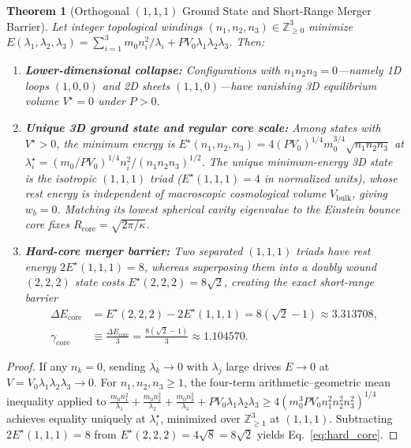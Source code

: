 \documentclass[pdflatex,sn-mathphys-num]{sn-jnl}
\theoremstyle{thmstyleone}
\newtheorem{theorem}{Theorem}
\theoremstyle{thmstyletwo}
\theoremstyle{thmstylethree}
\begin{document}
\begin{theorem}[Orthogonal $(1,1,1)$ Ground State and Short-Range Merger Barrier]\label{thm:triad}
Let integer topological windings $(n_1,n_2,n_3) \in \mathbb{Z}_{\ge 0}^3$ minimize $E(\lambda_1,\lambda_2,\lambda_3) = \sum_{i=1}^3 m_0 n_i^2/\lambda_i + PV_0\lambda_1\lambda_2\lambda_3$. Then:
\begin{enumerate}
\item \textbf{Lower-dimensional collapse:} Configurations with $n_1 n_2 n_3 = 0$---namely 1D loops $(1,0,0)$ and 2D sheets $(1,1,0)$---have vanishing 3D equilibrium volume $V^\star = 0$ under $P > 0$.
\item \textbf{Unique 3D ground state and regular core scale:} Among states with $V^\star > 0$, the minimum energy is $E^\star(n_1,n_2,n_3) = 4(PV_0)^{1/4}m_0^{3/4}\sqrt{n_1 n_2 n_3}$ at $\lambda_i^\star = (m_0/PV_0)^{1/4}n_i^2/(n_1 n_2 n_3)^{1/2}$. The unique minimum-energy 3D state is the isotropic $(1,1,1)$ triad ($E^\star(1,1,1) = 4$ in normalized units), whose rest energy is independent of macroscopic cosmological volume $V_{\mathrm{bulk}}$, giving $w_b = 0$. Matching its lowest spherical cavity eigenvalue to the Einstein bounce core fixes $R_{\mathrm{core}} = \sqrt{2\pi/\kappa}$.
\item \textbf{Hard-core merger barrier:} Two separated $(1,1,1)$ triads have rest energy $2E^\star(1,1,1) = 8$, whereas superposing them into a doubly wound $(2,2,2)$ state costs $E^\star(2,2,2) = 8\sqrt{2}$, creating the exact short-range barrier
\begin{align}
\Delta E_{\mathrm{core}} &= E^\star(2,2,2) - 2E^\star(1,1,1) = 8(\sqrt{2} - 1) \approx 3.313708, \nonumber\\
\gamma_{\mathrm{core}} &\equiv \frac{\Delta E_{\mathrm{core}}}{3} = \frac{8(\sqrt{2}-1)}{3} \approx 1.104570. \label{eq:hard_core}
\end{align}
\end{enumerate}
\end{theorem}

\begin{proof}
If any $n_k = 0$, sending $\lambda_k \to 0$ with $\lambda_j$ large drives $E \to 0$ at $V = V_0\lambda_1\lambda_2\lambda_3 \to 0$. For $n_1,n_2,n_3 \ge 1$, the four-term arithmetic--geometric mean inequality applied to $\frac{m_0 n_1^2}{\lambda_1} + \frac{m_0 n_2^2}{\lambda_2} + \frac{m_0 n_3^2}{\lambda_3} + PV_0\lambda_1\lambda_2\lambda_3 \ge 4(m_0^3 PV_0 n_1^2 n_2^2 n_3^2)^{1/4}$ achieves equality uniquely at $\lambda_i^\star$, minimized over $\mathbb{Z}_{\ge 1}^3$ at $(1,1,1)$. Subtracting $2E^\star(1,1,1) = 8$ from $E^\star(2,2,2) = 4\sqrt{8} = 8\sqrt{2}$ yields Eq.~\eqref{eq:hard_core}.
\end{proof}
\end{document}
